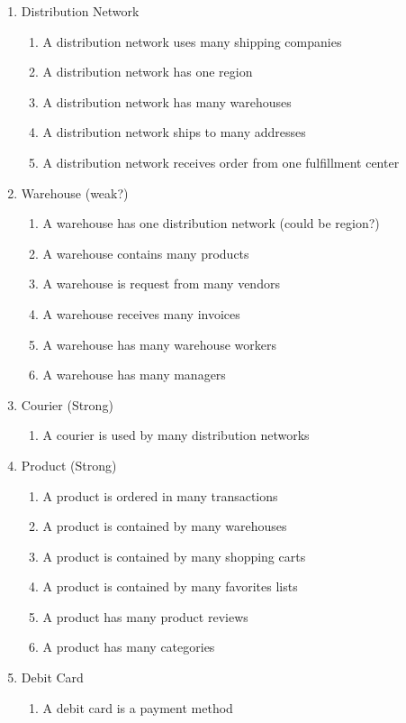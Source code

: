 \documentclass{article}
\begin{document}
\begin{enumerate}
\item Distribution Network
\begin{enumerate}
	\item A distribution network uses many shipping companies
	\item A distribution network has one region
	\item A distribution network has many warehouses
	\item A distribution network ships to many addresses
	\item A distribution network receives order from one fulfillment center
\end{enumerate}
	
\item Warehouse (weak?)
\begin{enumerate}
	\item A warehouse has one distribution network (could be region?)
	\item A warehouse contains many products
	\item A warehouse is request from many vendors
	\item A warehouse receives many invoices
	\item A warehouse has many warehouse workers
	\item A warehouse has many managers
\end{enumerate}

\item Courier (Strong)
\begin{enumerate}
	\item A courier is used by many distribution networks
\end{enumerate}

\item Product (Strong)
\begin{enumerate}
	\item A product is ordered in many transactions
	\item A product is contained by many warehouses
	\item A product is contained by many shopping carts
	\item A product is contained by many favorites lists
	\item A product has many product reviews
	\item A product has many categories
\end{enumerate}
	
\item Debit Card
\begin{enumerate}
	\item A debit card is a payment method
\end{enumerate}
	

\end{enumerate}
\end{document}
